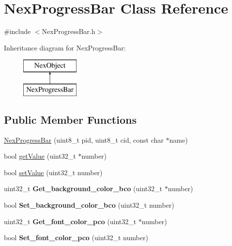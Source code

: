 \hypertarget{class_nex_progress_bar}{\section{Nex\+Progress\+Bar Class Reference}
\label{class_nex_progress_bar}
}


{\ttfamily \#include $<$Nex\+Progress\+Bar.\+h$>$}

Inheritance diagram for Nex\+Progress\+Bar\+:\begin{figure}[H]
\begin{center}
\leavevmode
\includegraphics[height=2.000000cm]{class_nex_progress_bar}
\end{center}
\end{figure}
\subsection*{Public Member Functions}
\begin{DoxyCompactItemize}
\item 
\hyperlink{class_nex_progress_bar_a61f76f0c855c7839630dbc930e3401d8}{Nex\+Progress\+Bar} (uint8\+\_\+t pid, uint8\+\_\+t cid, const char $\ast$name)
\item 
bool \hyperlink{class_nex_progress_bar_a3e5eb13b2aa014c8f6a9e16439917bf2}{get\+Value} (uint32\+\_\+t $\ast$number)
\item 
bool \hyperlink{class_nex_progress_bar_aaa7937d364cb63151bd1e1bc4729334d}{set\+Value} (uint32\+\_\+t number)
\item 
\hypertarget{class_nex_progress_bar_a2efc0d6694d8739fb9caa31c53190271}{uint32\+\_\+t {\bfseries Get\+\_\+background\+\_\+color\+\_\+bco} (uint32\+\_\+t $\ast$number)}\label{class_nex_progress_bar_a2efc0d6694d8739fb9caa31c53190271}

\item 
\hypertarget{class_nex_progress_bar_ab0b4230a6559989080e2a7b66b42ffc1}{bool {\bfseries Set\+\_\+background\+\_\+color\+\_\+bco} (uint32\+\_\+t number)}\label{class_nex_progress_bar_ab0b4230a6559989080e2a7b66b42ffc1}

\item 
\hypertarget{class_nex_progress_bar_aa148721b86c5f56c6321780da3ef974f}{uint32\+\_\+t {\bfseries Get\+\_\+font\+\_\+color\+\_\+pco} (uint32\+\_\+t $\ast$number)}\label{class_nex_progress_bar_aa148721b86c5f56c6321780da3ef974f}

\item 
\hypertarget{class_nex_progress_bar_a0ee8478a28a3c31d4b7179317299f711}{bool {\bfseries Set\+\_\+font\+\_\+color\+\_\+pco} (uint32\+\_\+t number)}\label{class_nex_progress_bar_a0ee8478a28a3c31d4b7179317299f711}

\end{DoxyCompactItemize}
